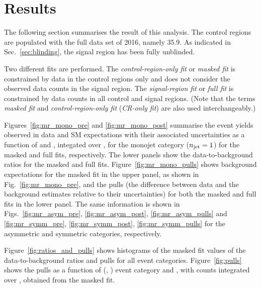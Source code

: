 \section{Results}
\label{sec:results}

The following section summarises the result of this analysis. The
control regions are populated with the full data set of 2016, namely
35.9\fbinv. As indicated in Sec.~\ref{sec:blinding}, the signal region
has been fully unblinded. 

Two different fits are performed. The {\it control-region-only fit} or
{\it masked fit} is constrained by data in the control regions only
and does not consider the observed data counts in the signal
region. The {\it signal-region fit} or {\it full fit} is constrained
by data counts in all control and signal regions. (Note that the terms
{\it masked fit} and {\it control-region-only fit} ({\it CR-only fit})
are also used interchangeably.)

Figures~\ref{fig:mr_mono_pre} and \ref{fig:mr_mono_post} summarise the
event yields observed in data and SM expectations with their
associated uncertainties as a function of \scalht and \nb, integated
over \mht, for the monojet category ($n_{\text{jet}} = 1$) for the masked and
full fits, respectively. The lower panels show the data-to-background
ratios for the masked and full fits.  Figure~\ref{fig:mr_mono_pulls}
shows background expectations for the masked fit in the upper panel,
as shown in Fig.~\ref{fig:mr_mono_pre}, and the pulls (\ie the
difference between data and the background estimates relative to their
uncertainties) for both the masked and full fits in the lower
panel. 
The same information is shown in Figs.~\ref{fig:mr_asym_pre},
\ref{fig:mr_asym_post}, \ref{fig:mr_asym_pulls} and
\ref{fig:mr_symm_pre}, \ref{fig:mr_symm_post}, \ref{fig:mr_symm_pulls}
for the asymmetric and symmetric \njet categories,
respectively. 

Figure~\ref{fig:ratios_and_pulls} shows histograms of the masked fit
values of the data-to-background ratios and pulls for all event
categories. Figure~\ref{fig:pulls} shows the pulls as a function of
(\njet, \nb) event category and \scalht, with counts integrated over
\mht, obtained from the masked fit.

